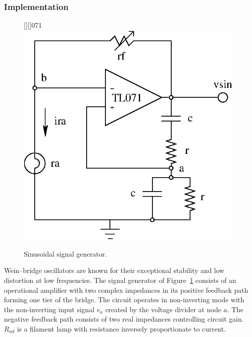 \subsubsection{Implementation}
\begin{figure}[htbp]
\begin{center}
	\psfrag{+}{+}
	\psfrag{-}{--}
	[][]{071}
	\includegraphics{sin-source.eps}
    \caption{Sinusoidal signal generator.}
    \label{fig:sin-source}
\end{center}
\end{figure}

Wein--bridge oscillators are known for their exceptional stability and
low distortion at low frequencies. The signal generator of
Figure~\ref{fig:sin-source} consists of an operational amplifier with
two complex impedances in its positive feedback path forming one tier
of the bridge. The circuit operates in non-inverting mode with the
non-inverting input signal $v_a$ created by the voltage divider at
node $a$. The negative feedback path consists of two real impedances
controlling circuit gain. $R_{ad}$ is a filament lamp with resistance
inversely proportionate to current.




